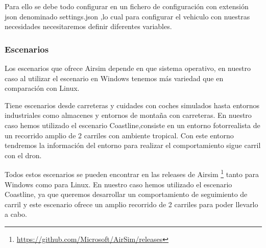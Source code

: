 Para ello se debe todo configurar en un fichero de configuración con extensión json denominado settings.json ,lo cual para configurar
el vehiculo con nuestras necesidades necesitaremos definir diferentes variables. 

\subsubsection{Escenarios}
\label{sec:airsim}
Los escenarios que ofrece Airsim depende en que sistema operativo, en nuestro caso al utilizar el escenario en Windows 
tenemos más variedad que en comparación con Linux. \newline

Tiene escenarios desde carreteras y cuidades con coches simulados hasta entornos industriales como almacenes y entornos de montaña con carreteras. En nuestro caso
hemos utilizado el escenario Coastline,consiste en un entorno fotorrealista de un recorrido amplio de 2 carriles con ambiente tropical. Con este entorno tendremos la
información del entorno para realizar el comportamiento sigue carril con el dron. \newline

Todos estos escenarios se pueden encontrar en las releases de Airsim \footnote{\url{https://github.com/Microsoft/AirSim/releases}} tanto para Windows como para Linux.
En nuestro caso hemos utilizado el escenario Coastline, ya que queremos desarrollar un comportamiento de seguimiento de carril y este escenario ofrece un amplio recorrido de 2 carriles para poder llevarlo
a cabo.

